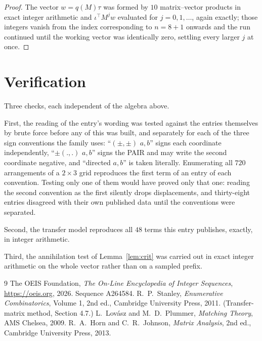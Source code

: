 \documentclass[11pt,a4paper]{article}
\theoremstyle{plain}
\theoremstyle{definition}
\begin{document}
\begin{proof}
The vector $w=q(M)\tau$ was formed by $10$ matrix--vector products in exact integer
arithmetic and $\iota^{\!\top}M^{j}w$ evaluated for $j=0,1,\dots$, again exactly; those
integers vanish from the index corresponding to $n=8+1$ onwards and the run continued
until the working vector was identically zero, settling every larger $j$ at once.
\end{proof}

\section{Verification}

Three checks, each independent of the algebra above.

First, the reading of the entry's wording was tested against the entries themselves by brute
force before any of this was built, and separately for each of the three sign conventions the
family uses: ``$(\pm,\pm)$ $a,b$'' signs each coordinate independently, ``$\pm(.,.)$ $a,b$''
signs the PAIR and may write the second coordinate negative, and ``directed $a,b$'' is taken
literally. Enumerating all $720$ arrangements of a $2\times3$ grid reproduces the first term
of an entry of each convention. Testing only one of them would have proved only that one:
reading the second convention as the first silently drops displacements, and thirty-eight
entries disagreed with their own published data until the conventions were separated.

Second, the transfer model reproduces all $48$ terms this entry publishes, exactly, in
integer arithmetic.

Third, the annihilation test of Lemma~\ref{lem:crit} was carried out in exact integer
arithmetic on the whole vector rather than on a sampled prefix.

\begin{thebibliography}{9}
 The OEIS Foundation, \emph{The On-Line Encyclopedia of Integer
Sequences}, \url{https://oeis.org}, 2026. Sequence A264584.
 R.~P.~Stanley, \emph{Enumerative Combinatorics}, Volume 1, 2nd ed.,
Cambridge University Press, 2011. (Transfer-matrix method, Section 4.7.)
 L.~Lov\'asz and M.~D.~Plummer, \emph{Matching Theory}, AMS Chelsea, 2009.
 R.~A.~Horn and C.~R.~Johnson, \emph{Matrix Analysis}, 2nd ed., Cambridge
University Press, 2013.
\end{thebibliography}
\end{document}
